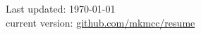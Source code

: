 \documentclass[11pt]{article}
\begin{document}
\vfill
\begin{minipage}[h!]{\linewidth}
  \hspace*{\fill}
  \begin{center}
    {\scriptsize  Last updated: \today \\
      current version: 
      \href{https://github.com/mkmcc/resume/raw/master/resume.pdf}%
      {github.com/mkmcc/resume}}
  \end{center}
  \hspace*{\fill}
\end{minipage}
\end{document}
